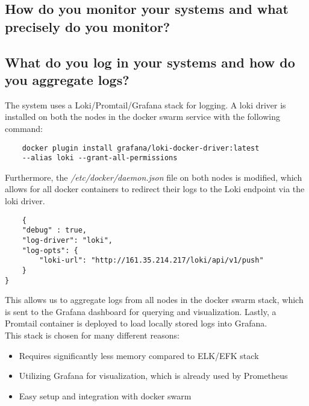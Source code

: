 \subsection{How do you monitor your systems and what precisely do you monitor?}


\subsection{What do you log in your systems and how do you aggregate logs?}
The system uses a Loki/Promtail/Grafana stack for logging. A loki driver is installed on both the nodes in the docker swarm service with the following command:

\begin{verbatim}
    docker plugin install grafana/loki-docker-driver:latest
    --alias loki --grant-all-permissions
\end{verbatim}

Furthermore, the \textit{/etc/docker/daemon.json} file on both nodes is modified, which allows for all docker containers to redirect their logs to the Loki endpoint via the loki driver.

\begin{verbatim}
    {
    "debug" : true,
    "log-driver": "loki",
    "log-opts": {
        "loki-url": "http://161.35.214.217/loki/api/v1/push"
    }
}
\end{verbatim}

This allows us to aggregate logs from all nodes in the docker swarm stack, which is sent to the Grafana dashboard for querying and visualization. Lastly, a Promtail container is deployed to load locally stored logs into Grafana.\\

\noindent
This stack is chosen for many different reasons:
\begin{itemize}
    \item Requires significantly less memory compared to ELK/EFK stack
    \item Utilizing Grafana for visualization, which is already used by Prometheus
    \item Easy setup and integration with docker swarm
\end{itemize}


